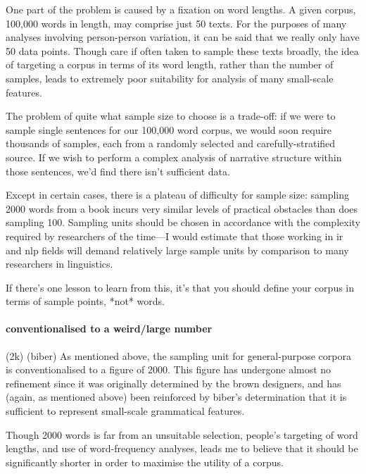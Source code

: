 
One part of the problem is caused by a fixation on word lengths. A given corpus, 100,000 words in length, may comprise just 50 texts. For the purposes of many analyses involving person-person variation, it can be said that we really only have 50 data points. Though care if often taken to sample these texts broadly, the idea of targeting a corpus in terms of its word length, rather than the number of samples, leads to extremely poor suitability for analysis of many small-scale features.

The problem of quite what sample size to choose is a trade-off: if we were to sample single sentences for our 100,000 word corpus, we would soon require thousands of samples, each from a randomly selected and carefully-stratified source. If we wish to perform a complex analysis of narrative structure within those sentences, we'd find there isn't sufficient data.

Except in certain cases, there is a plateau of difficulty for sample size: sampling 2000 words from a book incurs very similar levels of practical obstacles than does sampling 100. Sampling units should be chosen in accordance with the complexity required by researchers of the time---I would estimate that those working in ir and nlp fields will demand relatively large sample units by comparison to many researchers in linguistics.

If there's one lesson to learn from this, it's that you should define your corpus in terms of sample points, *not* words.




\paragraph{conventionalised to a weird/large number}
(2k) (biber)
As mentioned above, the sampling unit for general-purpose corpora is conventionalised to a figure of 2000. This figure has undergone almost no refinement since it was originally determined by the brown designers, and has (again, as mentioned above) been reinforced by biber's determination that it is sufficient to represent small-scale grammatical features.

Though 2000 words is far from an unsuitable selection, people's targeting of word lengths, and use of word-frequency analyses, leads me to believe that it should be significantly shorter in order to maximise the utility of a corpus.



